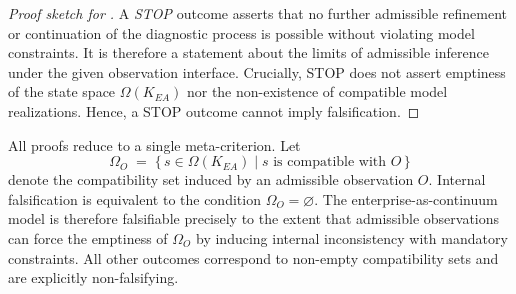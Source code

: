 \medskip

\begin{proof}[Proof sketch for ]
A \emph{STOP} outcome asserts that no further admissible refinement or
continuation of the diagnostic process is possible without violating model
constraints.
It is therefore a statement about the limits of admissible inference under
the given observation interface.
Crucially, STOP does not assert emptiness of the state space
\(\Omega(K_{EA})\) nor the non-existence of compatible model realizations.
Hence, a STOP outcome cannot imply falsification.
\end{proof}

\medskip

\begin{remark}
All proofs reduce to a single meta-criterion.
Let
\[
\Omega_O \;=\; \{\, s \in \Omega(K_{EA}) \mid s \text{ is compatible with }
O \,\}
\]
denote the compatibility set induced by an admissible observation \(O\).
Internal falsification is equivalent to the condition
\(\Omega_O = \varnothing\).
The enterprise-as-continuum model is therefore falsifiable precisely to the
extent that admissible observations can force the emptiness of
\(\Omega_O\) by inducing internal inconsistency with mandatory constraints.
All other outcomes correspond to non-empty compatibility sets and are
explicitly non-falsifying.
\end{remark}
